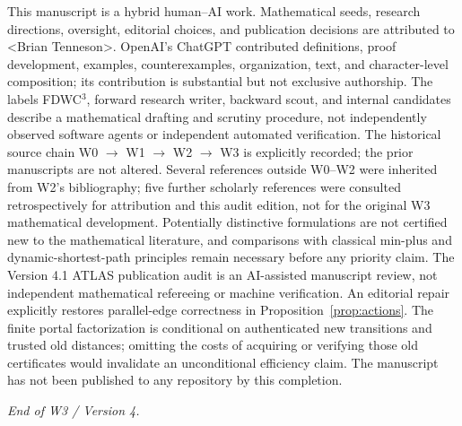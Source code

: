 \documentclass[11pt,letterpaper]{article}
\begin{document}
This manuscript is a hybrid human--AI work. Mathematical seeds, research directions, oversight, editorial choices, and publication decisions are attributed to \textless Brian Tenneson\textgreater. OpenAI's ChatGPT contributed definitions, proof development, examples, counterexamples, organization, text, and character-level composition; its contribution is substantial but not exclusive authorship. The labels FDWC$^3$, forward research writer, backward scout, and internal candidates describe a mathematical drafting and scrutiny procedure, not independently observed software agents or independent automated verification. The historical source chain W0 $\to$ W1 $\to$ W2 $\to$ W3 is explicitly recorded; the prior manuscripts are not altered. Several references outside W0--W2 were inherited from W2's bibliography; five further scholarly references were consulted retrospectively for attribution and this audit edition, not for the original W3 mathematical development. Potentially distinctive formulations are not certified new to the mathematical literature, and comparisons with classical min-plus and dynamic-shortest-path principles remain necessary before any priority claim. The Version 4.1 ATLAS publication audit is an AI-assisted manuscript review, not independent mathematical refereeing or machine verification. An editorial repair explicitly restores parallel-edge correctness in Proposition~\ref{prop:actions}. The finite portal factorization is conditional on authenticated new transitions and trusted old distances; omitting the costs of acquiring or verifying those old certificates would invalidate an unconditional efficiency claim. The manuscript has not been published to any repository by this completion.

\vfill
\noindent\textit{End of W3 / Version 4.}
\end{document}
